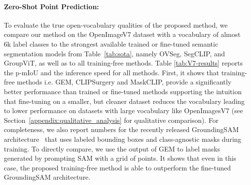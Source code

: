 \documentclass[10pt,twocolumn,letterpaper]{article}
\begin{document}
\paragraph{Zero-Shot Point Prediction:} 
To evaluate the true open-vocabulary qualities of the proposed method, we compare our method on the OpenImageV7 dataset with a vocabulary of almost 6k label classes to the strongest available trained or fine-tuned semantic segmentation models from Table~\ref{tab:sota}, namely OVSeg, SegCLIP,  and GroupViT, as well as to all training-free methods.
Table \ref{tab:V7-results} reports the p-mIoU and the inference speed for all methods. First, it shows that training-free methods i.e. GEM, CLIPSurgery and MaskCLIP, provide a significantly better performance than trained or fine-tuned methods supporting the intuition that fine-tuning on a smaller, but cleaner dataset reduces the vocabulary leading to lower performance on datasets with large vocabulary like OpenImagesV7 (see Section~\ref{appendix:qualitative_analysis} for qualitative comparison). 
For completeness, we also report numbers for the recently released GroundingSAM architecture~\citep{kirillov2023segment, liu2023grounding} that uses labeled bounding boxes and class-agnostic masks during training. To directly compare, we use the output of GEM to label masks generated by prompting SAM with a grid of points. It shows that even in this case, the proposed training-free method is able to outperform the fine-tuned GroundingSAM architecture.     
\end{document}
